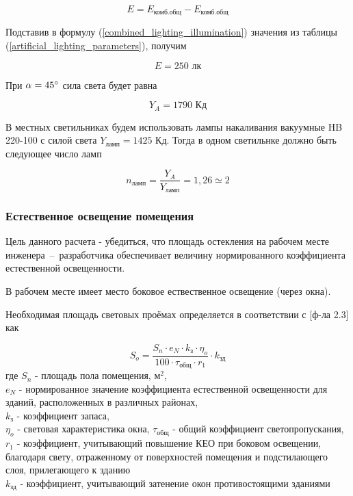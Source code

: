 \begin{equation}
    E = E_\text{комб.общ} - E_\text{комб.общ}
    \label{combined_lighting_illumination}
\end{equation}

Подставив в формулу (\ref{combined_lighting_illumination}) значения из таблицы
(\ref{artificial_lighting_parameters}), получим

$$
    E = 250 \text{ лк}
$$

При $\alpha = 45 \degree$ сила света будет равна

$$
    Y_A = 1790 \text{ Кд}
$$

В местных светильниках будем использовать лампы накаливания вакуумные HB 220-100
с силой света $Y_\text{ламп} = 1425$ Кд. Тогда в одном светильнке должно быть следующее число
ламп

$$
    n_\text{ламп} = \frac{Y_A}{Y_\text{ламп}} = 1,26 \simeq 2
$$

\subsubsection{Естественное освещение помещения}

Цель данного расчета - убедиться, что площадь остекления на рабочем месте
инженера~--~разработчика обеспечивает величину нормированного коэффициента
естественной освещенности.

В рабочем месте имеет место боковое ествественное освещение (через окна).

Необходимая площадь световых проёмах определяется в соответствии с
\cite{lighting_calc_method}[ф-ла 2.3] как

\begin{equation}
    S_o = \frac{S_n \cdot e_N \cdot k_\text{з} \cdot \eta_o}{100 \cdot \tau_\text{общ} \cdot r_1}
            \cdot k_\text{зд}
    \label{windows_area}
\end{equation}
где $S_n$ - площадь пола помещения, $\text{м}^2$,                                   \\
$e_N$ - нормированное значение коэффициента естественной освещенности для зданий,
расположенных в различных районах,                                                  \\
$k_\text{з}$ - коэффициент запаса,                                                  \\
$\eta_o$ - световая характеристика окна,
$\tau_\text{общ}$ - общий коэффициент светопропускания,                             \\
$r_1$ - коэффициент, учитывающий повышение КЕО при боковом освещении, благодаря
свету, отраженному от поверхностей помещения и подстилающего слоя, прилегающего
к зданию                                                                            \\
$k_\text{зд}$ - коэффициент, учитывающий затенение окон противостоящими зданиями

